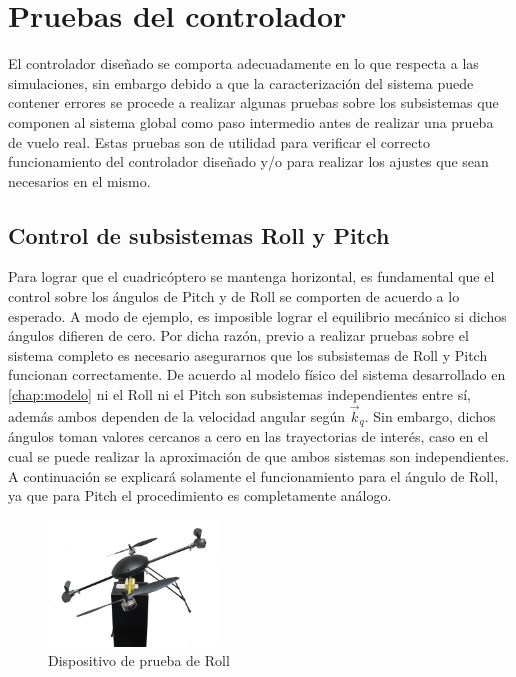 \documentclass[main]{subfiles}
\begin{document}
\chapter{Pruebas del controlador}
El controlador diseñado se comporta adecuadamente en lo que respecta a las simulaciones, sin embargo debido a que la caracterizaci\'on del sistema puede contener errores se procede a realizar algunas pruebas sobre los subsistemas que componen al sistema global como paso intermedio antes de realizar una prueba de vuelo real. Estas pruebas son de utilidad para verificar el correcto funcionamiento del controlador diseñado y/o para realizar los ajustes que sean necesarios en el mismo.

\section{Control de subsistemas Roll y Pitch}

Para lograr que el cuadric\'optero se mantenga horizontal, es fundamental que el control sobre los \'angulos de Pitch y de Roll se comporten de acuerdo a lo esperado. A modo de ejemplo, es imposible lograr el equilibrio mec\'anico si dichos \'angulos difieren de cero. Por dicha raz\'on, previo a realizar pruebas sobre el sistema completo es necesario asegurarnos que los subsistemas de  Roll y Pitch funcionan correctamente. De acuerdo al modelo f\'isico del sistema desarrollado en \ref{chap:modelo} ni el Roll ni el Pitch son subsistemas independientes entre s\'i, adem\'as ambos dependen de la velocidad angular seg\'un $\vec{k}_q$. Sin embargo, dichos \'angulos toman valores cercanos a cero en las trayectorias de inter\'es, caso en el cual se puede realizar la aproximaci\'on de que ambos sistemas son independientes.\\

A continuación se explicará solamente el funcionamiento para el ángulo de Roll, ya que para Pitch el procedimiento es completamente análogo.\\

\begin{figure}
	\vspace{-20pt}
	\centering
	\includegraphics[width=0.4\textwidth]{./pics_test_control/dispositivo_psi.pdf}
	\caption{Dispositivo de prueba de Roll}
	\label{fig:psidisp}
	\vspace{-20pt}
\end{figure}
\end{document}
